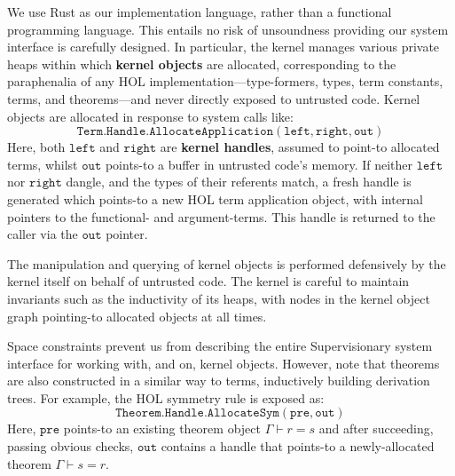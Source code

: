 \documentclass[sigplan, review]{acmart}
\newcommand{\deffont}[1]{\textbf{#1}}
\begin{document}
We use Rust as our implementation language, rather than a functional programming language.
This entails no risk of unsoundness providing our system interface is carefully designed.
In particular, the kernel manages various private heaps within which \deffont{kernel objects} are allocated, corresponding to the paraphenalia of any HOL implementation---type-formers, types, term constants, terms, and theorems---and never directly exposed to untrusted code.
Kernel objects are allocated in response to system calls like:
\begin{displaymath}
\mathtt{Term.Handle.AllocateApplication(left, right, out)}
\end{displaymath}
Here, both $\mathtt{left}$ and $\mathtt{right}$ are \deffont{kernel handles}, assumed to point-to allocated terms, whilst $\mathtt{out}$ points-to a buffer in untrusted code's memory.
If neither $\mathtt{left}$ nor $\mathtt{right}$ dangle, and the types of their referents match, a fresh handle is generated which points-to a new HOL term application object, with internal pointers to the functional- and argument-terms.
This handle is returned to the caller via the $\mathtt{out}$ pointer.

The manipulation and querying of kernel objects is performed defensively by the kernel itself on behalf of untrusted code.
The kernel is careful to maintain invariants such as the inductivity of its heaps, with nodes in the kernel object graph pointing-to allocated objects at all times.

Space constraints prevent us from describing the entire Supervisionary system interface for working with, and on, kernel objects.
However, note that theorems are also constructed in a similar way to terms, inductively building derivation trees.
For example, the HOL symmetry rule is exposed as:
\begin{displaymath}
\mathtt{Theorem.Handle.AllocateSym(pre, out)}
\end{displaymath}
Here, $\mathtt{pre}$ points-to an existing theorem object $\Gamma \vdash r = s$ and after succeeding, passing obvious checks, $\mathtt{out}$ contains a handle that points-to a newly-allocated theorem $\Gamma \vdash s = r$.
\end{document}
